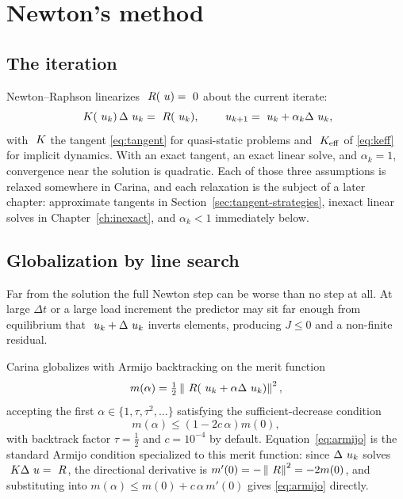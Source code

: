 \chapter{Newton's method}
\label{ch:newton}

\section{The iteration}

Newton--Raphson linearizes $~R(~u) = ~0$ about the current iterate:
\begin{equation}
  ~K(~u_k)\, \Delta~u_k = ~R(~u_k),
  \qquad
  ~u_{k+1} = ~u_k + \alpha_k \Delta~u_k ,
  \label{eq:newton}
\end{equation}
with $~K$ the tangent \eqref{eq:tangent} for quasi-static problems and
$~K_{\mathrm{eff}}$ of \eqref{eq:keff} for implicit dynamics.  With an exact tangent, an
exact linear solve, and $\alpha_k = 1$, convergence near the solution is
quadratic.  Each of those three assumptions is relaxed somewhere in Carina, and
each relaxation is the subject of a later chapter: approximate tangents in
Section~\ref{sec:tangent-strategies}, inexact linear solves in
Chapter~\ref{ch:inexact}, and $\alpha_k < 1$ immediately below.

\section{Globalization by line search}
\label{sec:linesearch}

Far from the solution the full Newton step can be worse than no step at all.
At large $\Delta t$ or a large load increment the predictor may sit far enough
from equilibrium that $~u_k + \Delta~u_k$ inverts elements, producing
$J \le 0$ and a non-finite residual.

Carina globalizes with Armijo backtracking on the merit function
\begin{equation}
  m(\alpha) = \tfrac12 \left\lVert ~R(~u_k + \alpha \Delta~u_k) \right\rVert^2 ,
\end{equation}
accepting the first $\alpha \in \{1, \tau, \tau^2, \dots\}$ satisfying the
sufficient-decrease condition
\begin{equation}
  m(\alpha) \le \left(1 - 2 c\, \alpha\right) m(0),
  \label{eq:armijo}
\end{equation}
with backtrack factor $\tau = \tfrac12$ and $c = 10^{-4}$ by default.
Equation~\eqref{eq:armijo} is the standard Armijo condition specialized to this
merit function: since $\Delta~u_k$ solves $~K\Delta~u = ~R$, the
directional derivative is $m'(0) = -\left\lVert ~R \right\rVert^2 = -2m(0)$, and substituting
into $m(\alpha) \le m(0) + c\,\alpha\, m'(0)$ gives \eqref{eq:armijo} directly.

